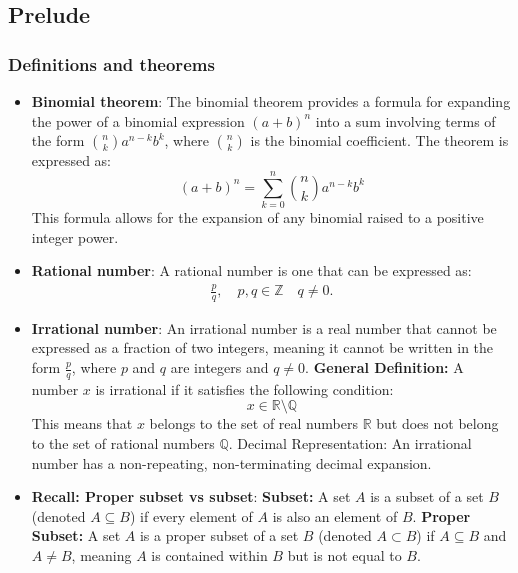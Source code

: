 \documentclass{report}
\begin{document}
    \pagebreak 
    \bigbreak \noindent 
    \subsection{Prelude}
    \bigbreak \noindent 
    \subsubsection{Definitions and theorems}
    \begin{itemize}
        \item \textbf{Binomial theorem}:
            The binomial theorem provides a formula for expanding the power of a binomial expression \((a + b)^n\) into a sum involving terms of the form \(\binom{n}{k} a^{n-k} b^k\), where \(\binom{n}{k}\) is the binomial coefficient. The theorem is expressed as:
            \[
                (a + b)^n = \sum_{k=0}^{n} \binom{n}{k} a^{n-k} b^k
            \]
            This formula allows for the expansion of any binomial raised to a positive integer power.
        \item \textbf{Rational number}: A rational number is one that can be expressed as:
            \begin{align*}
                \frac{p}{q}, \quad p,q \in \mathbb{Z} \quad q \ne 0
            .\end{align*}
        \item \textbf{Irrational number}: An irrational number is a real number that cannot be expressed as a fraction of two integers, meaning it cannot be written in the form \(\frac{p}{q}\), where \(p\) and \(q\) are integers and \(q \neq 0\).
            \bigbreak \noindent 
            \textbf{General Definition:} A number \(x\) is irrational if it satisfies the following condition:
            \[
                x \in \mathbb{R} \setminus \mathbb{Q}
            \]
            This means that \(x\) belongs to the set of real numbers \(\mathbb{R}\) but does not belong to the set of rational numbers \(\mathbb{Q}\).
            \bigbreak \noindent 
            Decimal Representation: An irrational number has a non-repeating, non-terminating decimal expansion.
        \item \textbf{Recall: Proper subset vs subset}: 
            \bigbreak \noindent 
            \textbf{Subset:} A set \(A\) is a subset of a set \(B\) (denoted \(A \subseteq B\)) if every element of \(A\) is also an element of \(B\).
            \bigbreak \noindent 
            \textbf{Proper Subset:} A set \(A\) is a proper subset of a set \(B\) (denoted \(A \subset B\)) if \(A \subseteq B\) and \(A \neq B\), meaning \(A\) is contained within \(B\) but is not equal to \(B\).


\end{itemize}
\end{document}
